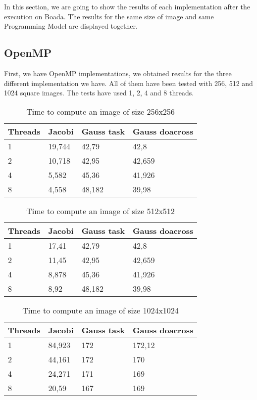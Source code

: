 \documentclass[a4paper, 10pt]{article}
\begin{document}
In this section, we are going to show the results of each implementation after the execution on Boada. The results for the same size of image and same Programming Model are displayed together.

\subsection{OpenMP}

First, we have OpenMP implementations, we obtained results for the three different implementation we have. All of them have been tested with 256, 512 and 1024 square images. The tests have used 1, 2, 4 and 8 threads.

\begin{table}[ht]
\centering

\begin{tabular}{l|lll} 
\toprule
Threads & Jacobi & Gauss task & Gauss doacross  \\ 
\hline
1       & 19,744 & 42,79      & 42,8            \\
2       & 10,718 & 42,95      & 42,659          \\
4       & 5,582  & 45,36      & 41,926          \\
8       & 4,558  & 48,182     & 39,98           \\
\bottomrule
\end{tabular}
\caption{Time to compute an image of size 256x256}
\end{table}

\begin{table}[ht]

\centering
\begin{tabular}{l|lll} 
\toprule
Threads & Jacobi & Gauss task & Gauss doacross  \\ 
\hline
1       & 17,41  & 42,79      & 42,8            \\
2       & 11,45  & 42,95      & 42,659          \\
4       & 8,878  & 45,36      & 41,926          \\
8       & 8,92   & 48,182     & 39,98           \\
\bottomrule
\end{tabular}
\caption{Time to compute an image of size 512x512}
\end{table}

\begin{table}[ht]

\centering
\begin{tabular}{l|lll} 
\toprule
Threads & Jacobi & Gauss task & Gauss doacross  \\ 
\hline
1       & 84,923 & 172        & 172,12          \\
2       & 44,161 & 172        & 170             \\
4       & 24,271 & 171        & 169             \\
8       & 20,59  & 167        & 169             \\
\bottomrule
\end{tabular}
\caption{Time to compute an image of size 1024x1024}
\end{table}
\end{document}
